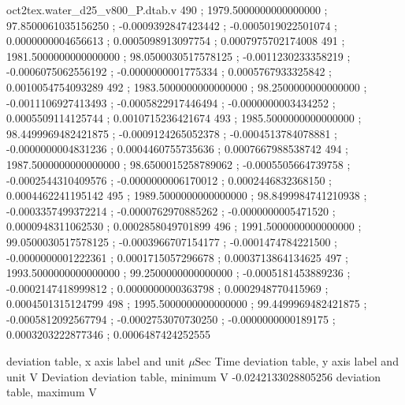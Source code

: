 \begin{filecontents}[overwrite]{oct2tex.water_d25_v800_P.dtab.v}
490 ; 1979.5000000000000000 ; 97.8500061035156250 ; -0.0009392847423442 ; -0.0005019022501074 ; 0.0000000004656613 ; 0.0005098913097754 ; 0.0007975702174008
491 ; 1981.5000000000000000 ; 98.0500030517578125 ; -0.0011230233358219 ; -0.0006075062556192 ; -0.0000000001775334 ; 0.0005767933325842 ; 0.0010054754093289
492 ; 1983.5000000000000000 ; 98.2500000000000000 ; -0.0011106927413493 ; -0.0005822917446494 ; -0.0000000003434252 ; 0.0005509114125744 ; 0.0010715236421674
493 ; 1985.5000000000000000 ; 98.4499969482421875 ; -0.0009124265052378 ; -0.0004513784078881 ; -0.0000000004831236 ; 0.0004460755735636 ; 0.0007667988538742
494 ; 1987.5000000000000000 ; 98.6500015258789062 ; -0.0005505664739758 ; -0.0002544310409576 ; -0.0000000006170012 ; 0.0002446832368150 ; 0.0004462241195142
495 ; 1989.5000000000000000 ; 98.8499984741210938 ; -0.0003357499372214 ; -0.0000762970885262 ; -0.0000000005471520 ; 0.0000948311062530 ; 0.0002858049701899
496 ; 1991.5000000000000000 ; 99.0500030517578125 ; -0.0003966707154177 ; -0.0001474784221500 ; -0.0000000001222361 ; 0.0001715057296678 ; 0.0003713864134625
497 ; 1993.5000000000000000 ; 99.2500000000000000 ; -0.0005181453889236 ; -0.0002147418999812 ; 0.0000000000363798 ; 0.0002948770415969 ; 0.0004501315124799
498 ; 1995.5000000000000000 ; 99.4499969482421875 ; -0.0005812092567794 ; -0.0002753070730250 ; -0.0000000000189175 ; 0.0003203222877346 ; 0.0006487424252555
\end{filecontents}
\expandafter\def\csname oct2tex.water_d25_v800_P.dtabxlbl.d\endcsname{deviation table, x axis label and unit}
\expandafter\def\csname oct2tex.water_d25_v800_P.dtabxlbl.u\endcsname{\ensuremath{\mu\text{Sec}}}
\expandafter\def\csname oct2tex.water_d25_v800_P.dtabxlbl.v\endcsname{Time}
\expandafter\def\csname oct2tex.water_d25_v800_P.dtabylbl.d\endcsname{deviation table, y axis label and unit}
\expandafter\def\csname oct2tex.water_d25_v800_P.dtabylbl.u\endcsname{\ensuremath{\text{V}}}
\expandafter\def\csname oct2tex.water_d25_v800_P.dtabylbl.v\endcsname{Deviation}
\expandafter\def\csname oct2tex.water_d25_v800_P.dtabmin.d\endcsname{deviation table, minimum}
\expandafter\def\csname oct2tex.water_d25_v800_P.dtabmin.u\endcsname{\ensuremath{\text{V}}}
\expandafter\def\csname oct2tex.water_d25_v800_P.dtabmin.v\endcsname{-0.0242133028805256}
\expandafter\def\csname oct2tex.water_d25_v800_P.dtabmax.d\endcsname{deviation table, maximum}
\expandafter\def\csname oct2tex.water_d25_v800_P.dtabmax.u\endcsname{\ensuremath{\text{V}}}
